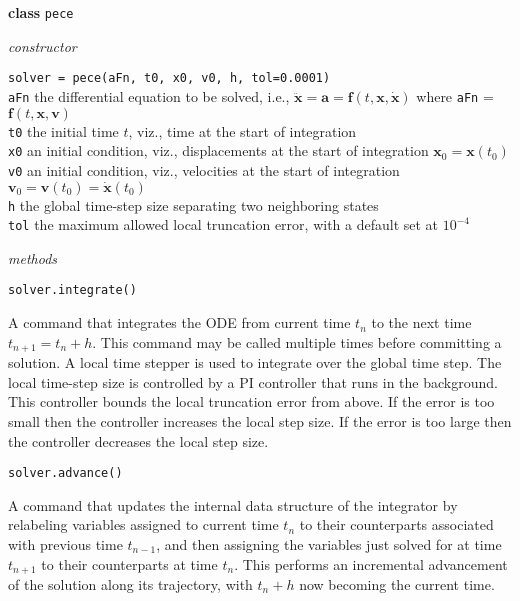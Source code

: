 \newpage
\bigskip\noindent
\textbf{class} \texttt{pece}

\medskip\noindent
\textit{constructor}

\medskip\noindent
\texttt{solver = pece(aFn, t0, x0, v0, h, tol=0.0001)} \\
\indent \texttt{aFn} \; the differential equation to be solved, i.e., $\ddot{\mathbf{x}} = \mathbf{a} = \mathbf{f} (t, \mathbf{x}, \dot{\mathbf{x}})$ where \texttt{aFn} = $\mathbf{f}(t,\mathbf{x},\mathbf{v})$ \\
\indent \texttt{t0} \;\;\; the initial time $t$, viz., time at the start of integration \\
\indent \texttt{x0} \;\;\; an initial condition, viz., displacements at the start of integration $\mathbf{x}_0 = \mathbf{x}(t_0)$  \\
\indent \texttt{v0} \;\;\; an initial condition, viz., velocities at the start of integration $\mathbf{v}_0 = \mathbf{v}(t_0) = \dot{\mathbf{x}}(t_0)$  \\
\indent \texttt{h} \;\;\;\;\; the global time-step size separating two neighboring states \\
\indent \texttt{tol} \;\hspace{1pt} the maximum allowed local truncation error, with a default set at $10^{-4}$

\medskip\noindent
\textit{methods}

\medskip\noindent
\texttt{solver.integrate()}

\medskip\noindent
A command that integrates the ODE from current time $t_n$ to the next time $t_{n+1} = t_n + h$.  This command may be called multiple times before committing a solution.  A local time stepper is used to integrate over the global time step.  The local time-step size is controlled by a PI controller that runs in the background.  This controller bounds the local truncation error from above.  If the error is too small then the controller increases the local step size.  If the error is too large then the controller decreases the local step size.

\medskip\noindent
\texttt{solver.advance()}

\medskip\noindent
A command that updates the internal data structure of the integrator by relabeling variables assigned to current time $t_n$ to their counterparts associated with previous time $t_{n-1}$, and then assigning the variables just solved for at time $t_{n+1}$ to their counterparts at time $t_n$.  This performs an incremental advancement of the solution along its trajectory, with $t_n + h$ now becoming the current time.

